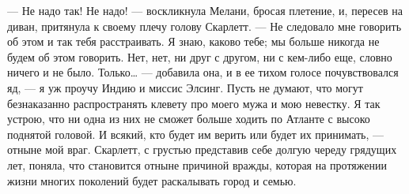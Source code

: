 — Не надо так! Не надо! — воскликнула Мелани, бросая плетение, и, пересев на диван, притянула к своему плечу голову Скарлетт. — Не следовало мне говорить об этом и так тебя расстраивать. Я знаю, каково тебе; мы больше никогда не будем об этом говорить. Нет, нет, ни друг с другом, ни с кем-либо еще, словно ничего и не было. Только… — добавила она, и в ее тихом голосе почувствовался яд, — я уж проучу Индию и миссис Элсинг. Пусть не думают, что могут безнаказанно распространять клевету про моего мужа и мою невестку. Я так устрою, что ни одна из них не сможет больше ходить по Атланте с высоко поднятой головой. И всякий, кто будет им верить или будет их принимать, — отныне мой враг. Скарлетт, с грустью представив себе долгую череду грядущих лет, поняла, что становится отныне причиной вражды, которая на протяжении жизни многих поколений будет раскалывать город и семью.





